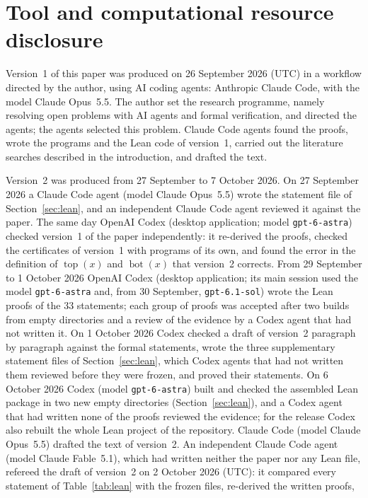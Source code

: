\documentclass[11pt]{article}
\theoremstyle{remark}
\newcommand{\tp}{\operatorname{top}}
\newcommand{\bt}{\operatorname{bot}}
\begin{document}
\section*{Tool and computational resource disclosure}
Version~1 of this paper was produced on 26 September 2026 (UTC) in a workflow
directed by the author, using AI coding agents: Anthropic Claude Code, with
the model Claude Opus~5.5. The author set the research programme, namely
resolving open problems with AI agents and formal verification, and directed
the agents; the agents selected this problem. Claude Code agents found the
proofs, wrote the programs and the Lean code of version~1, carried out the
literature searches described in the introduction, and drafted the text.

Version~2 was produced from 27 September to 7 October 2026. On
27 September 2026 a Claude Code agent (model Claude Opus~5.5) wrote the
statement file of Section~\ref{sec:lean}, and an independent Claude Code agent
reviewed it against the paper. The same day OpenAI Codex (desktop application;
model \texttt{gpt-6-astra}) checked version~1 of the
paper independently: it re-derived the proofs, checked the certificates of
version~1 with programs of its own, and found the error in the definition of
$\tp(x)$ and $\bt(x)$ that version~2 corrects. From 29 September to
1 October 2026 OpenAI Codex (desktop application; its main session used the
model \texttt{gpt-6-astra} and, from 30 September, \texttt{gpt-6.1-sol})
wrote the Lean proofs of the $33$ statements; each group of proofs was
accepted after two builds from empty directories and a review of the evidence
by a Codex agent that had not written it. On 1 October 2026 Codex checked a
draft of version~2 paragraph by paragraph against the formal statements, wrote
the three supplementary statement files of Section~\ref{sec:lean}, which Codex
agents that had not written them reviewed before they were frozen, and proved
their statements. On 6 October 2026 Codex (model \texttt{gpt-6-astra}) built
and checked the assembled Lean package in two new empty directories
(Section~\ref{sec:lean}), and a Codex agent that had written none of the
proofs reviewed the evidence; for the release Codex also rebuilt the whole Lean
project of the repository.
Claude Code (model Claude Opus~5.5) drafted the text of
version~2. An independent Claude Code agent (model Claude Fable~5.1), which
had written neither the paper nor any Lean file, refereed the draft of
version~2 on 2 October 2026 (UTC): it compared every statement of
Table~\ref{tab:lean} with the frozen files, re-derived the written proofs,
\end{document}
